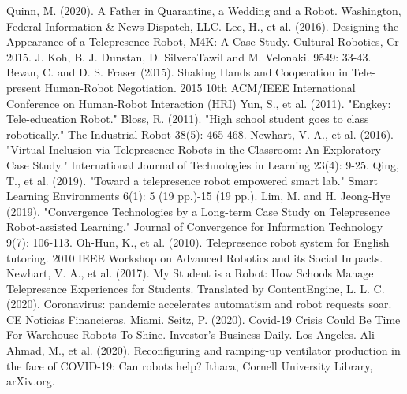 \documentclass[a4paper]{article}
\begin{document}
\begin{thebibliography}{99}
    Quinn, M. (2020). A Father in Quarantine, a Wedding and a Robot. Washington, Federal Information \& News Dispatch, LLC.
    Lee, H., et al. (2016). Designing the Appearance of a Telepresence Robot, M4K: A Case Study. Cultural Robotics, Cr 2015. J. Koh, B. J. Dunstan, D. SilveraTawil and M. Velonaki. 9549: 33-43.
    Bevan, C. and D. S. Fraser (2015). Shaking Hands and Cooperation in Tele-present Human-Robot Negotiation. 2015 10th ACM/IEEE International Conference on Human-Robot Interaction (HRI)
    Yun, S., et al. (2011). "Engkey: Tele-education Robot."
    Bloss, R. (2011). "High school student goes to class robotically." The Industrial Robot 38(5): 465-468.
    Newhart, V. A., et al. (2016). "Virtual Inclusion via Telepresence Robots in the Classroom: An Exploratory Case Study." International Journal of Technologies in Learning 23(4): 9-25.
    Qing, T., et al. (2019). "Toward a telepresence robot empowered smart lab." Smart Learning Environments 6(1): 5 (19 pp.)-15 (19 pp.).
    Lim, M. and H. Jeong-Hye (2019). "Convergence Technologies by a Long-term Case Study on Telepresence Robot-assisted Learning." Journal of Convergence for Information Technology 9(7): 106-113.
    Oh-Hun, K., et al. (2010). Telepresence robot system for English tutoring. 2010 IEEE Workshop on Advanced Robotics and its Social Impacts.
    Newhart, V. A., et al. (2017). My Student is a Robot: How Schools Manage Telepresence Experiences for Students.
    Translated by ContentEngine, L. L. C. (2020). Coronavirus: pandemic accelerates automatism and robot requests soar. CE Noticias Financieras. Miami.
    Seitz, P. (2020). Covid-19 Crisis Could Be Time For Warehouse Robots To Shine. Investor's Business Daily. Los Angeles.
    Ali Ahmad, M., et al. (2020). Reconfiguring and ramping-up ventilator production in the face of COVID-19: Can robots help? Ithaca, Cornell University Library, arXiv.org.
\end{thebibliography}
\end{document}
